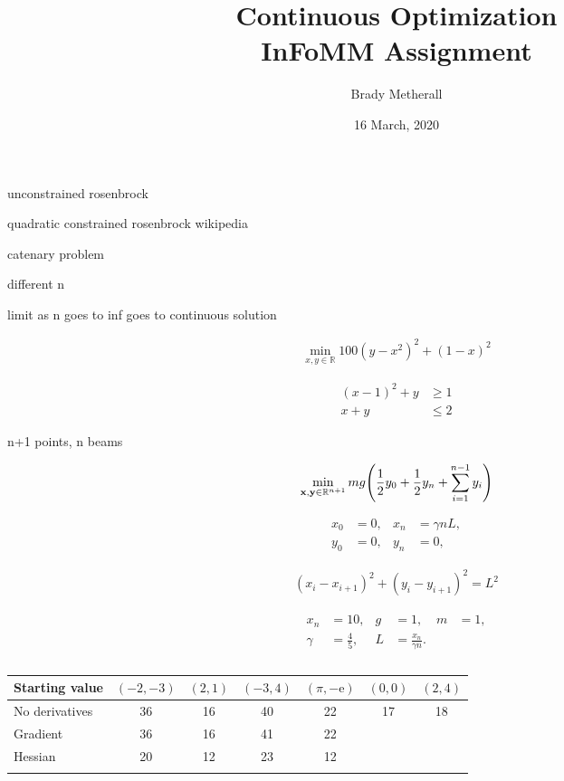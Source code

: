 \documentclass[11pt,a4paper,twocolumn]{article}
\title{Continuous Optimization \\ InFoMM Assignment}
\author{Brady Metherall}
\date{16 March, 2020}
\let\originalleft\left
\let\originalright\right
\renewcommand{\left}{\mathopen{}\mathclose\bgroup\originalleft}
\renewcommand{\right}{\aftergroup\egroup\originalright}
\begin{document}
\maketitle

unconstrained rosenbrock

quadratic constrained rosenbrock wikipedia

catenary problem

different n

limit as n goes to inf goes to continuous solution

\begin{align}
	\min_{x, y \in \mathbb{R}} 100(y - x^2)^2 + (1 - x)^2
\end{align}

\begin{align}
	(x - 1)^2 + y &\geq 1 \\
	x + y &\leq 2
\end{align}

n+1 points, n beams

\begin{align}
	\min_{\mathbf{x}, \mathbf{y} \in \mathbb{R}^{n+1}} m g \left( \frac{1}{2} y_0 + \frac{1}{2} y_n + \sum_{i = 1}^{n-1} y_i \right)
\end{align}

\begin{align}
	x_0 &= 0, & x_n &= \gamma n L, \\
	y_0 &=0, & y_n &= 0,
\end{align}

\begin{align}
	(x_i - x_{i+1})^2 + (y_i - y_{i+1})^2 = L^2
\end{align}

\begin{align}
	x_n &= 10, & g &= 1, & m &= 1, \\
	\gamma &= \frac{4}{5}, & L &= \frac{x_n}{\gamma n}.
\end{align}


\begin{figure}[tbp]
	\centering
	
	\caption{}
	\label{fig:rosen}
\end{figure}

\lipsum[1-8]

\begin{table*}
	\centering
	\begin{tabular}{lcccccc}
		\hline\noalign{\smallskip}
		Starting value & $(-2,-3)$ & $(2,1)$ & $(-3,4)$ & $(\pi,-\textrm{e})$ & $(0,0)$ & $(2,4)$ \\
		\hline\noalign{\smallskip}
		No derivatives & 36 & 16 & 40 & 22 & 17 & 18 \\
		Gradient & 36 & 16 & 41 & 22 &  & \\
		Hessian & 20 & 12 & 23 & 12 & & \\
		\noalign{\smallskip}\hline\noalign{\smallskip}
	\end{tabular}
	\caption{}
	\label{tab:iterations}
\end{table*}
\end{document}
